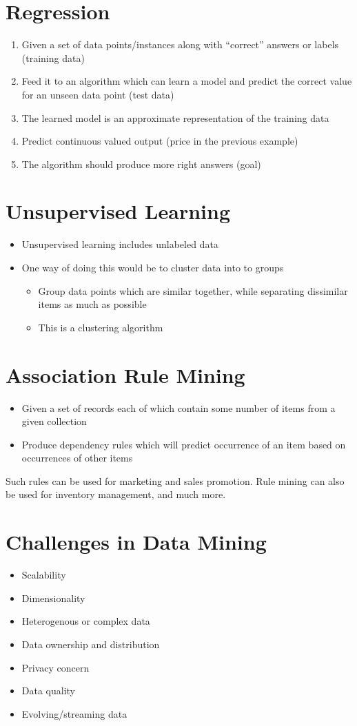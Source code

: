 \section{Regression}
\begin{enumerate}
    \item Given a set of data points/instances along with “correct” answers or labels (training data)
    \item Feed it to an algorithm which can learn a model and predict the correct value for an unseen data point (test data)
    \item The learned model is an approximate representation of the training data
    \item Predict continuous valued output (price in the previous example)
    \item The algorithm should produce more right answers (goal)
\end{enumerate}

\section{Unsupervised Learning}
\begin{itemize}
    \item Unsupervised learning includes unlabeled data
    \item One way of doing this would be to cluster data into to groups
    \begin{itemize}
        \item Group data points which are similar together, while separating dissimilar items as much as possible
        \item This is a clustering algorithm
    \end{itemize}
\end{itemize}

\section{Association Rule Mining}
\begin{itemize}
    \item Given a set of records each of which contain some number of items from a given collection
    \item Produce dependency rules which will predict occurrence of an item based on occurrences of other items
\end{itemize}
Such rules can be used for marketing and sales promotion. Rule mining can also be used for inventory management, and much more.

\section{Challenges in Data Mining}
\begin{itemize}
    \item Scalability
    \item Dimensionality
    \item Heterogenous or complex data
    \item Data ownership and distribution
    \item Privacy concern
    \item Data quality
    \item Evolving/streaming data
\end{itemize}

